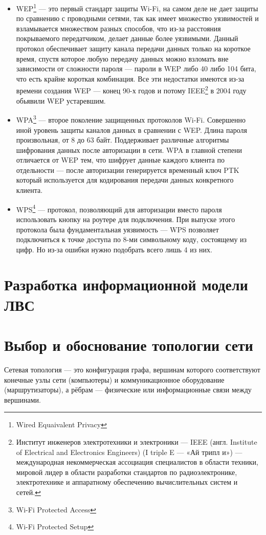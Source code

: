 \documentclass[russian,utf8,pointsection,simple,14pt]{eskdtext}
\begin{document}
	\begin{itemize}
		\item WEP\footnote{Wired Equaivalent Privacy} --- это первый стандарт защиты Wi-Fi, на самом деле не дает защиты по сравнению с проводными сетями, так как имеет множество уязвимостей и взламывается множеством разных способов, что из-за расстояния покрываемого передатчиком, делает данные более уязвимыми. Данный протокол обеспечивает защиту канала передачи данных только на короткое время, спустя которое любую передачу данных можно взломать вне зависимости от сложности пароля --- пароли в WEP либо 40 либо 104 бита, что есть крайне короткая комбинация. Все эти недостатки имеются из-за времени создания WEP --- конец 90-х годов и потому IEEE\footnote{Институт инженеров электротехники и электроники — IEEE (англ. Institute of Electrical and Electronics Engineers) (I triple E — «Ай трипл и») — международная некоммерческая ассоциация специалистов в области техники, мировой лидер в области разработки стандартов по радиоэлектронике, электротехнике и аппаратному обеспечению вычислительных систем и сетей.} в 2004 году обьявили WEP устаревшим.
		\item WPA\footnote{Wi-Fi Protected Access}  --- второе поколение защищенных протоколов Wi-Fi. Совершенно иной уровень защиты каналов данных в сравнении с WEP. Длина пароля произвольная, от 8 до 63 байт. Поддерживает различные алгоритмы шифрования данных после авторизации в сети. WPA в главной степени отличается от WEP тем, что шифрует данные каждого клиента по отдельности --- после авторизации генерируется временный ключ PTK который используется для кодирования передачи данных конкретного клиента.
		\item WPS\footnote{Wi-Fi Protected Setup} --- протокол, позволяющий для авторизации вместо пароля использовать кнопку на роутере для подключения. При выпуске этого протокола была фундаментальная уязвимость --- WPS позволяет подключиться к точке доступа по 8-ми символьному коду, состоящему из цифр. Но из-за ошибки нужно подобрать всего лишь 4 из них.
	\end{itemize}
\newpage

\section{Разработка информационной модели ЛВС}
\newpage

	\section{Выбор и обоснование топологии сети}
Сетевая топология — это конфигурация графа, вершинам которого соответствуют конечные узлы сети (компьютеры) и коммуникационное оборудование (маршрутизаторы), а рёбрам — физические или информационные связи между вершинами. 
\end{document}
